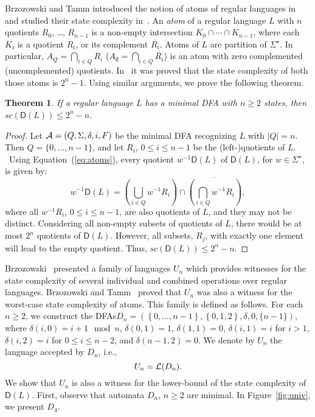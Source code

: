 \documentclass{article}
\newtheorem{theorem}{Theorem}
\newcommand{\dfa}{DFA\xspace}
\newcommand{\dfas}{DFAs\xspace}
\newcommand{\comp}[1]{\overline{#1}}
\newcommand{\dis}[1]{\mathsf{D}(#1)}
\newcommand{\Set}[1]{\left\{ #1 \right\}}
\newcommand{\kleene}[1]{#1^\star}
\newcommand{\lang}[1]{{\cal L}(#1)}
\begin{document}
Brzozowski and Tamm introduced
the notion of atoms of regular languages in~\cite{brzozowski11:_theor_of_atomat}
  and studied their state complexity in~\cite{brzozowski13:_compl_of_atoms_of_regul_languag}. 
An \emph{atom} of a regular language $L$ with $n$ quotients $R_0$, \ldots,
$R_{n-1}$ is a non-empty intersection $K_0\cap\cdots\cap K_{n-1}$,
where each $K_i$ is a quotient $R_i $, or its complement
$\comp{R_i }$. Atoms of $L$ are partition of  $\Sigma^\star$.
In particular, $A_Q=\bigcap_{i\in Q}R_i $ 
($A_\emptyset=\bigcap_{i\in Q}\comp{R_i }$) is an atom with zero complemented 
(uncomplemented) quotients.
In~\cite{brzozowski13:_compl_of_atoms_of_regul_languag} it
was proved that the state complexity of both those atoms is $2^n-1$. 
Using similar arguments, we prove the following theorem.

\begin{theorem}
  \label{theo:scdistub}
If a regular language $L$ has a  minimal \dfa with $n\geq 2$ states, then
$sc(\dis{L})\leq 2^n-n$. 
\end{theorem}
\begin{proof}
  Let ${\cal A}=(Q,\Sigma,\delta,i,F)$ be the minimal \dfa recognizing
  $L$ with $|Q|=n$. 
Then $Q=\{0,\ldots,n-1\}$, and let $R_i $, $0\leq i\leq n-1$ be the
  (left-)quotients of $L$. 
\ Using Equation~(\ref{eq:atoms}), every quotient $w^{-1}\dis{L}$
  of $\dis{L}$, for $w\in \kleene{\Sigma}$, is given by:
\begin{equation*}
  w^{-1}\dis{L} = \left(\bigcup_{i\in
      Q}w^{-1}R_i \right)\cap\comp{\left (\bigcap_{i\in 
        Q}w^{-1}R_i \right )},
\end{equation*}
\noindent where all $w^{-1}R_i$, $0\leq i\leq n-1$, are also
quotients of $L$, and they may not be distinct. 
Considering all non-empty subsets of quotients of $L$, 
there would be at most $2^n$ quotients of $\dis{L}$. 
However, all subsets, $R_j$, with exactly one element 
will lead to the empty quotient.  Thus, $sc(\dis{L})\leq 2^n-n$. 
\end{proof}

Brzozowski~\cite{brzozowski13:_in_searc_of_most_compl_regul_languag}
presented a family of languages $U_n$ which provides witnesses for the
state complexity of several individual and combined operations over
regular languages. Brzozowski and
Tamm~\cite{brzozowski13:_compl_of_atoms_of_regul_languag} proved that
$U_n$ was also a witness for the worst-case state complexity of
atoms. This family is defined as follows. For each $n\geq 2$, 
we construct the \dfas $D_n = (\Set{0,\ldots,n-1}, \Set{0,1,2},
\delta,0,\{n-1\})$, where  
$\delta(i,0)=i+1\mod n$, $\delta(0, 1) = 1$, $\delta(1, 1) = 0$,
$\delta(i, 1) = i$ for  
$i > 1$, $\delta(i, 2) = i$ for $0 \leq i\leq n-2$, and $\delta(n-1,
2) = 0$. 
We denote by $U_n$
the language accepted by $D_n$, i.e.,
\begin{equation}
 \label{edef:universal}
U_n=\lang{D_n}.
\end{equation}
We show that $U_n$ is also a witness for the lower-bound of the state
complexity of $\dis{L}$. 
First, observe that automata $D_n$, $n\geq 2$ are minimal. 
In Figure~\ref{fig:univ}, we present $D_4$.
\end{document}
